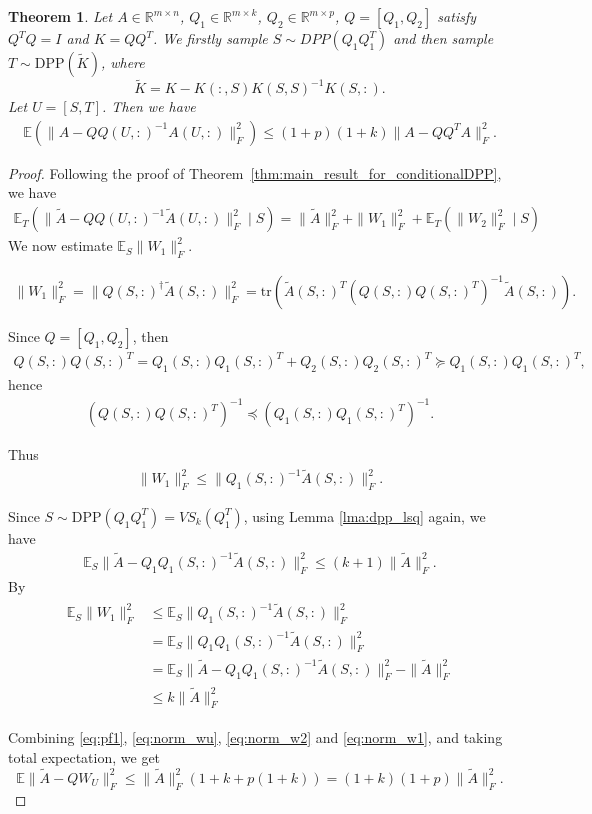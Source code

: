 \documentclass[11pt]{article}
\newtheorem{theorem}{Theorem}[section]
\newcommand{\be}{\begin{eqnarray}}
\newcommand{\ee}{\end{eqnarray}}
\newcommand{\<}{\langle}
\renewcommand{\>}{\rangle}
\begin{document}
\begin{theorem}
\label{thm:main_result}
    Let $A \in \mathbb{R}^{m \times n}$, $Q_1 \in \mathbb{R}^{m \times k}$, $Q_2 \in \mathbb{R}^{m \times p}$, $Q = [Q_1, Q_2]$ satisfy $Q^TQ = I$ and $K = QQ^T$. We firstly sample $S\sim DPP(Q_1Q_1^T)$ and then sample $T \sim \mathrm{DPP}(\widetilde K)$,
    where
    \[
    \widetilde K = K - K(:,S) K(S,S)^{-1} K(S,:).
\]
Let $U = [S, T]$. Then we have
\be
\mathbb{E}\!\left( \| A - QQ(U,:)^{-1} A(U,:) \|_F^2  \right)
\le (1+p)(1+k) \| A - QQ^TA \|_F^2.
\ee
\end{theorem}
\begin{proof}   
Following the proof of Theorem~\ref{thm:main_result_for_conditionalDPP}, we have
\be
 \mathbb{E}_T(\| \widetilde A - Q Q(U,:)^{-1} \widetilde A(U,:) \|_F^2\mid S) =\|\widetilde A\|_F^2 + \| W_1\|_F^2 + \mathbb{E}_T(\| W_2\|_F^2\mid S)
\ee
We now estimate $\mathbb{E}_S\|W_1\|_F^2$.

\be
\|W_1\|_F^2
= \|Q(S,:)^\dagger \widetilde A(S,:)\|_F^2
= \mathrm{tr}\!\left( \widetilde A(S,:)^T (Q(S,:)Q(S,:)^T)^{-1} \widetilde A(S,:) \right).
\ee

Since $Q = [Q_1, Q_2]$, then
\be
Q(S,:) Q(S,:)^T = Q_1(S,:)Q_1(S,:)^T + Q_2(S,:)Q_2(S,:)^T
\succeq Q_1(S,:)Q_1(S,:)^T,
\ee
hence
\be
(Q(S,:) Q(S,:)^T)^{-1} \preceq (Q_1(S,:)Q_1(S,:)^T)^{-1}.
\ee

Thus
\be
\|W_1\|_F^2
\le \|Q_1(S,:)^{-1} \widetilde A(S,:)\|_F^2.
\ee

Since $S \sim \mathrm{DPP}(Q_1Q_1^T) = VS_k(Q_1^T)$, using Lemma \ref{lma:dpp_lsq} again, we have
\be
\mathbb{E}_S \|\widetilde A - Q_1 Q_1(S,:)^{-1} \widetilde A(S,:)\|_F^2
\leq (k+1)\|\widetilde A\|_F^2.
\ee
By 
\be
\label{eq:norm_w1}
\begin{aligned}
\mathbb{E}_S \|W_1\|_F^2 &\le \mathbb{E}_S \|Q_1(S,:)^{-1} \widetilde A(S,:)\|_F^2 \\
&=\mathbb{E}_S \|Q_1Q_1(S,:)^{-1} \widetilde A(S,:)\|_F^2\\
&=\mathbb{E}_S \|\widetilde A - Q_1Q_1(S,:)^{-1} \widetilde A(S,:)\|_F^2 - 
\|\widetilde A\|_F^2 \\
&\leq k \|\widetilde A\|_F^2    
\end{aligned}
\ee

\medskip

Combining \eqref{eq:pf1}, \eqref{eq:norm_wu}, \eqref{eq:norm_w2} and \eqref{eq:norm_w1}, and taking total expectation, we get
\[
\mathbb{E}\|\widetilde A - Q W_U\|_F^2
\le \|\widetilde A\|_F^2 (1 + k + p(1+k))
= (1+k)(1+p)\|\widetilde A\|_F^2.
\]
\end{proof}

 

\end{document}
